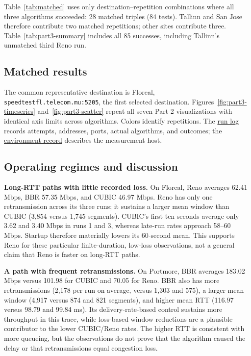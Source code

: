 \documentclass[11pt,letterpaper]{article}
\newcommand{\codelink}[2]{\href{https://github.com/RohMalpani/CS422Assignments/blob/main/assignment2/#2}{#1}}
\begin{document}
Table~\ref{tab:matched} uses only destination--repetition combinations
where all three algorithms succeeded: 28 matched triples (84 tests).
Tallinn and San Jose therefore contribute two matched repetitions; other sites
contribute three. Table~\ref{tab:part3-summary} includes all
85 successes, including Tallinn's unmatched third Reno run.


\subsection{Matched results}

\begin{table}[H]
\centering
\small

\caption{Means over matched repetitions. Goodput is the arithmetic mean of
interval goodput; RTT is the mean sampled RTT. Each successful test has 60
samples. Generated by \codelink{\texttt{summarize\_results.py}}{part3/summarize_results.py\#L37}.}
\label{tab:matched}
\end{table}

The common representative destination is Floreal,
\texttt{speedtestfl.telecom.mu:5205}, the first selected destination. Figures~\ref{fig:part3-timeseries} and~\ref{fig:part3-scatter} repeat all
seven Part 2 visualizations with identical axis limits across algorithms. Colors identify repetitions.
The \codelink{run log}{results/part3-live/part3_runs.csv} records attempts,
addresses, ports, actual algorithms, and outcomes; the
\codelink{environment record}{results/part3-live/run_environment.txt}
describes the measurement host.


\clearpage

\subsection{Operating regimes and discussion}

\textbf{Long-RTT paths with little recorded loss.}
On Floreal, Reno averages 62.41 Mbps, BBR 57.35 Mbps, and CUBIC 46.97 Mbps.
Reno has only one retransmission across its three runs; it sustains a larger
mean window than CUBIC (3,854 versus 1,745 segments). CUBIC's first ten seconds
average only 3.62 and 3.40 Mbps in runs 1 and 3, whereas late-run rates approach
58--60 Mbps. Startup therefore materially lowers its 60-second mean. This
supports Reno for these particular finite-duration, low-loss observations,
not a general claim that Reno is faster on long-RTT paths.

\textbf{A path with frequent retransmissions.}
On Portmore, BBR averages 183.02 Mbps versus 101.98 for CUBIC and 70.05 for Reno.
BBR also has more retransmissions (2,178 per run on average, versus 1,303 and
575), a larger mean window (4,917 versus 874 and 821 segments), and higher mean
RTT (116.97 versus 98.79 and 99.84 ms). Its delivery-rate-based control sustains
more throughput in this trace, while loss-based window reductions are a
plausible contributor to the lower CUBIC/Reno rates. The higher RTT is
consistent with more queueing, but the observations do not prove that the
algorithm caused the delay or that retransmissions equal congestion loss.
\end{document}
